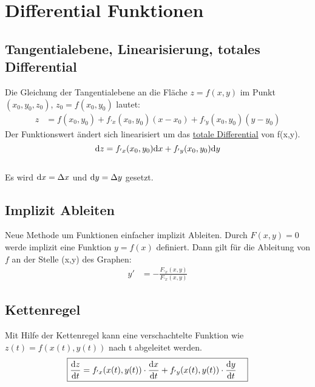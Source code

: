 



\chapter{Differential Funktionen}
\section{Tangentialebene, Linearisierung, totales Differential}
Die Gleichung der Tangentialebene an die Fläche $z=f(x,y)$ im Punkt$(x_0,y_0,z_0)$, $z_0=f(x_0,y_0)$ lautet:
\[
\boxed{\begin{aligned}	
		z&=f(x_0,y_0) + f_{'x}(x_0,y_0)(x-x_0)+ f_{'y}(x_0,y_0)(y-y_0)
	\end{aligned}}\]
\newline
Der Funktionswert ändert sich linearisiert um das \underline{totale Differential} von f(x,y).
	\[\mathrm{d} z= f_{'x}(x_0,y_0)\mathrm{d} x + f_{'y}(x_0,y_0)\mathrm{d} y\]\\
Es wird $\mathrm{d} x= \Delta x$ und $\mathrm{d} y= \Delta y$ gesetzt.
	
\section{Implizit Ableiten}
Neue Methode um Funktionen einfacher implizit Ableiten.
Durch $F(x,y)=0$ werde implizit eine Funktion $y=f(x)$ definiert. Dann gilt für die Ableitung von $f$ an der Stelle (x,y) des Graphen:
\[
\boxed{\begin{aligned}	
		y'&=-\frac{F_{'x}(x,y)}{F_{'x}(x,y)}
	\end{aligned}}\]
	
	
\section{Kettenregel}
Mit Hilfe der Kettenregel kann eine verschachtelte Funktion wie $z(t)=f(x(t),y(t))$ nach t abgeleitet werden.
\[
\boxed{\begin{aligned}	
		\frac{\mathrm{d} z}{\mathrm{d} t}&=f_{'x}(x(t),y(t))\cdot \frac{\mathrm{d} x}{\mathrm{d} t}+f_{'y}(x(t),y(t))\cdot \frac{\mathrm{d} y}{\mathrm{d} t}
	\end{aligned}}\]
	
